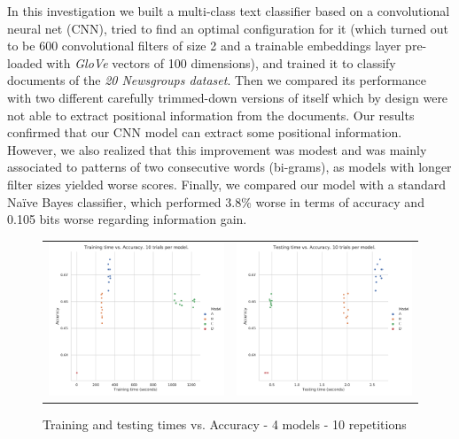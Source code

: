 \documentclass[10pt,journal,compsoc, onecolumn]{IEEEtran}
\begin{document}
In this investigation we built a multi-class text classifier based on a convolutional neural net (CNN), tried to find an optimal configuration for it (which turned out to be 600 convolutional filters of size 2 and a trainable embeddings layer pre-loaded with \textit{GloVe} vectors of 100 dimensions), and trained it to classify documents of the \textit{20 Newsgroups dataset}. Then we compared its performance with two different carefully trimmed-down versions of itself which by design were not able to extract positional information from the documents. Our results confirmed that our CNN model can extract some positional information. However, we also realized that this improvement was modest and was mainly associated to patterns of two consecutive words (bi-grams), as models with longer filter sizes yielded worse scores. Finally, we compared our model with a standard Naïve Bayes classifier, which performed 3.8\% worse in terms of accuracy and 0.105 bits worse regarding information gain.

\begin{figure}[h]
\begin{tabular}{c c}
    \includegraphics[width=.5\linewidth]{images/chart_29.pdf} &
    \includegraphics[width=.5\linewidth]{images/chart_30.pdf} \\
\end{tabular}
\caption{Training and testing times vs. Accuracy - 4 models -  10 repetitions}
\label{fig:times}
\end{figure}
\end{document}
